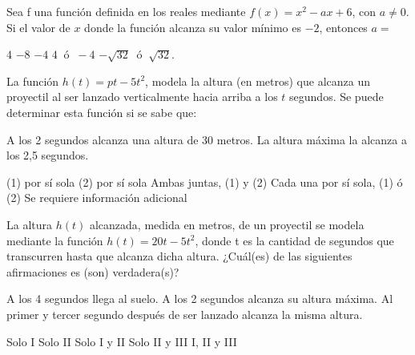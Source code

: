 \documentclass[sin nombre]{srs}
\begin{document}
\begin{preguntas}[after-item-skip=2cm]
\pregunta Sea f una función definida en los reales mediante $f\left(x\right) = x^{2} - ax + 6$, con $a \neq 0$. Si el valor de $x$ donde la función alcanza su valor mínimo es $-2$, entonces $a =$
\begin{vertical}
\alternativa $4$
\alternativa $-8$
\alternativa $-4$
\alternativa $4~ \text{ ó }~ -4$
\alternativa $-\sqrt{32} ~\text{ ó }~ \sqrt{32}$.
\end{vertical}

\pregunta La función $h\left(t\right) = pt - 5t^{2}$, modela la altura (en metros) que alcanza un proyectil al ser lanzado verticalmente hacia arriba a los $t$ segundos. Se puede determinar esta función si se sabe que:
\begin{verticaln}
\alternativa A los 2 segundos alcanza una altura de 30 metros.
\alternativa La altura máxima la alcanza a los 2,5 segundos.
\end{verticaln}
\begin{vertical}
\alternativa (1) por sí sola
\alternativa (2) por sí sola
\alternativa Ambas juntas, (1) y (2)
\alternativa Cada una por sí sola, (1) ó (2)
\alternativa Se requiere información adicional
\end{vertical}

\pregunta La altura $h\left(t\right)$ alcanzada, medida en metros, de un proyectil se modela mediante la función $h\left(t\right) = 20t - 5t^{2}$, donde t es la cantidad de segundos que transcurren hasta que alcanza dicha altura. ¿Cuál(es) de las siguientes afirmaciones es (son) verdadera(s)?
\begin{verticali}
\alternativa A los 4 segundos llega al suelo.
\alternativa A los 2 segundos alcanza su altura máxima.
\alternativa Al primer y tercer segundo después de ser lanzado alcanza la misma altura.
\end{verticali}
\begin{vertical}
\alternativa Solo I
\alternativa Solo II
\alternativa Solo I y II
\alternativa Solo II y III
\alternativa I, II y III
\end{vertical}

\end{preguntas}
\end{document}

